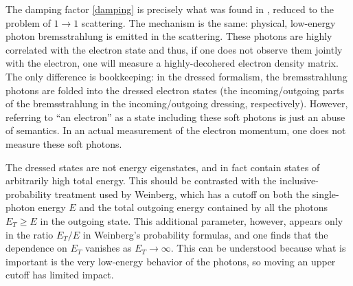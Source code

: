 \documentclass[twocolumn,prd]{revtex4}
\begin{document}
The damping factor \eqref{damping} is precisely what was found in \cite{Carney:2017jut}, reduced to the problem of $1 \to 1$ scattering. The mechanism is the same: physical, low-energy photon bremsstrahlung is emitted in the scattering. These photons are highly correlated with the electron state and thus, if one does not observe them jointly with the electron, one will measure a highly-decohered electron density matrix. The only difference is bookkeeping: in the dressed formalism, the bremsstrahlung photons are folded into the dressed electron states (the incoming/outgoing parts of the bremsstrahlung in the incoming/outgoing dressing, respectively). However, referring to ``an electron'' as a state including these soft photons is just an abuse of semantics. In an actual measurement of the electron momentum, one does not measure these soft photons.

The dressed states are not energy eigenstates, and in fact contain states of arbitrarily high total energy. This should be contrasted with the inclusive-probability treatment used by Weinberg, which has a cutoff on both the single-photon energy $E$ and the total outgoing energy contained by all the photons $E_T \geq E$ in the outgoing state.\cite{Weinberg:1965nx} This additional parameter, however, appears only in the ratio $E_T/E$ in Weinberg's probability formulas, and one finds that the dependence on $E_T$ vanishes as $E_T \to \infty$. This can be understood because what is important is the very low-energy behavior of the photons, so moving an upper cutoff has limited impact.
\end{document}
